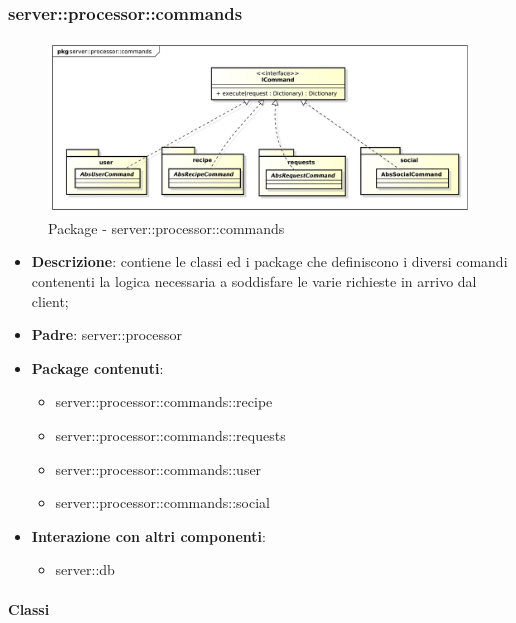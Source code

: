     \subsubsection{server::processor::commands} %
    \label{ssub:bdsm_app_server_processor_commands}
    \begin{figure}[!htbp]
      \centering
      \centerline{\includegraphics[scale=0.4]{./images/server/commands.pdf}}
      \caption{Package - server::processor::commands}
    \end{figure}
    \begin{itemize}
      \item \textbf{Descrizione}: contiene le classi ed i package che definiscono i diversi comandi contenenti la logica necessaria a soddisfare le varie richieste in arrivo dal client;
      \item \textbf{Padre}: server::processor
      \item \textbf{Package contenuti}:
        \begin{itemize}
          \item server::processor::commands::recipe
          \item server::processor::commands::requests
          \item server::processor::commands::user
          \item server::processor::commands::social
        \end{itemize}
      \item \textbf{Interazione con altri componenti}:
        \begin{itemize}
          \item server::db
        \end{itemize}
    \end{itemize}

      \paragraph{Classi} %

